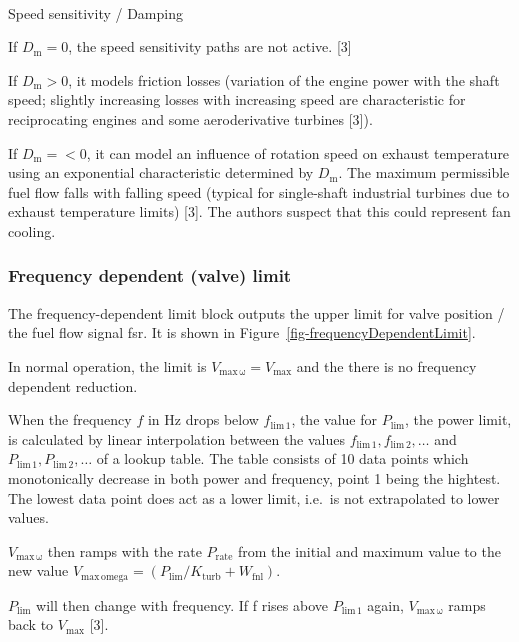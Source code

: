 \documentclass[
  a4paper,
  DIV=11,
  numbers=noendperiod]{scrartcl}
\makeatletter
\let\oldparagraph\paragraph
\renewcommand{\paragraph}{
    \@ifstar
      \xxxParagraphStar
      \xxxParagraphNoStar
  }
\newcommand{\xxxParagraphStar}[1]{\oldparagraph*{#1}\mbox{}}
\newcommand{\xxxParagraphNoStar}[1]{\oldparagraph{#1}\mbox{}}
\makeatother
\begin{document}
\paragraph{Speed sensitivity / Damping}\label{sec-speedSensitivity}

If \(D_\mathrm{m}=0\), the speed sensitivity paths are not active.
{[}3{]}

If \(D_\mathrm{m}>0\), it models friction losses (variation of the
engine power with the shaft speed; slightly increasing losses with
increasing speed are characteristic for reciprocating engines and some
aeroderivative turbines {[}3{]}).

If \(D_\mathrm{m}=<0\), it can model an influence of rotation speed on
exhaust temperature using an exponential characteristic determined by
\(D_\mathrm{m}\). The maximum permissible fuel flow falls with falling
speed (typical for single-shaft industrial turbines due to exhaust
temperature limits) {[}3{]}. The authors suspect that this could
represent fan cooling.

\subsubsection{Frequency dependent (valve)
limit}\label{sec-freqDepLimit}

The frequency-dependent limit block outputs the upper limit for valve
position / the fuel flow signal fsr. It is shown in
Figure~\ref{fig-frequencyDependentLimit}.

In normal operation, the limit is
\(V_\mathrm{max\,\omega} = V_\mathrm{max}\) and the there is no
frequency dependent reduction.

When the frequency \(f\) in Hz drops below \(f_\mathrm{lim\,1}\), the
value for \(P_\mathrm{lim}\), the power limit, is calculated by linear
interpolation between the values
\(f_\mathrm{lim\,1}, f_\mathrm{lim\,2}, \dots\) and
\(P_\mathrm{lim\,1}, P_\mathrm{lim\,2}, \dots\) of a lookup table. The
table consists of 10 data points which monotonically decrease in both
power and frequency, point 1 being the hightest. The lowest data point
does act as a lower limit, i.e.~is not extrapolated to lower values.

\(V_\mathrm{max\,\omega}\) then ramps with the rate \(P_\mathrm{rate}\)
from the initial and maximum value to the new value
\(V_\mathrm{max\,omega} = (P_\mathrm{lim} / K_\mathrm{turb} + W_\mathrm{fnl})\).

\(P_\mathrm{lim}\) will then change with frequency. If f rises above
\(P_\mathrm{lim\,1}\) again, \(V_\mathrm{max\,\omega}\) ramps back to
\(V_\mathrm{max}\) {[}3{]}.
\end{document}
